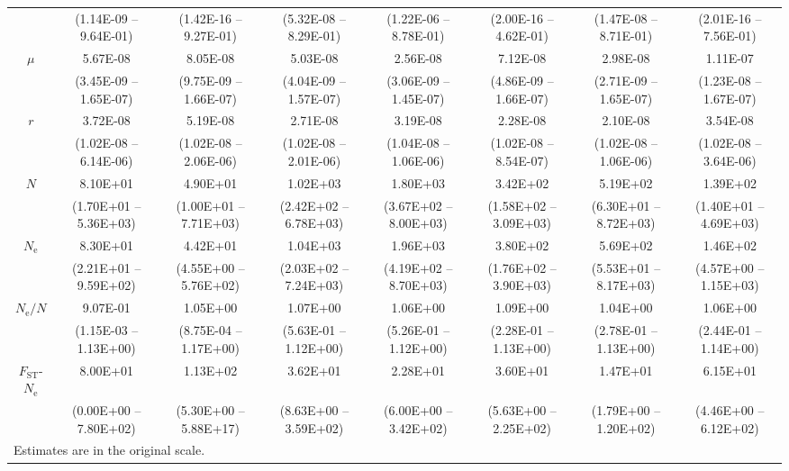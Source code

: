 \documentclass[a4paper, 12pt]{article}
\begin{document}
\begin{table}
\begin{tiny}
\begin{tabular}{cccccccc}
         & (1.14E-09 – 9.64E-01) & (1.42E-16 – 9.27E-01) & (5.32E-08 – 8.29E-01) & (1.22E-06 – 8.78E-01) & (2.00E-16 – 4.62E-01) & (1.47E-08 – 8.71E-01) & (2.01E-16 – 7.56E-01) \\
        $\mu$ & 5.67E-08 & 8.05E-08 & 5.03E-08 & 2.56E-08 & 7.12E-08 & 2.98E-08 & 1.11E-07 \\
         & (3.45E-09 – 1.65E-07) & (9.75E-09 – 1.66E-07) & (4.04E-09 – 1.57E-07) & (3.06E-09 – 1.45E-07) & (4.86E-09 – 1.66E-07) & (2.71E-09 – 1.65E-07) & (1.23E-08 – 1.67E-07) \\
        $r$ & 3.72E-08 & 5.19E-08 & 2.71E-08 & 3.19E-08 & 2.28E-08 & 2.10E-08 & 3.54E-08 \\
         & (1.02E-08 – 6.14E-06) & (1.02E-08 – 2.06E-06) & (1.02E-08 – 2.01E-06) & (1.04E-08 – 1.06E-06) & (1.02E-08 – 8.54E-07) & (1.02E-08 – 1.06E-06) & (1.02E-08 – 3.64E-06) \\
        $N$ & 8.10E+01 & 4.90E+01 & 1.02E+03 & 1.80E+03 & 3.42E+02 & 5.19E+02 & 1.39E+02 \\
         & (1.70E+01 – 5.36E+03) & (1.00E+01 – 7.71E+03) & (2.42E+02 – 6.78E+03) & (3.67E+02 – 8.00E+03) & (1.58E+02 – 3.09E+03) & (6.30E+01 – 8.72E+03) & (1.40E+01 – 4.69E+03) \\
        $N_{\mathrm{e}}$ & 8.30E+01 & 4.42E+01 & 1.04E+03 & 1.96E+03 & 3.80E+02 & 5.69E+02 & 1.46E+02 \\
         & (2.21E+01 – 9.59E+02) & (4.55E+00 – 5.76E+02) & (2.03E+02 – 7.24E+03) & (4.19E+02 – 8.70E+03) & (1.76E+02 – 3.90E+03) & (5.53E+01 – 8.17E+03) & (4.57E+00 – 1.15E+03) \\
        $N_{\mathrm{e}}/N$ & 9.07E-01 & 1.05E+00 & 1.07E+00 & 1.06E+00 & 1.09E+00 & 1.04E+00 & 1.06E+00 \\
         & (1.15E-03 – 1.13E+00) & (8.75E-04 – 1.17E+00) & (5.63E-01 – 1.12E+00) & (5.26E-01 – 1.12E+00) & (2.28E-01 – 1.13E+00) & (2.78E-01 – 1.13E+00) & (2.44E-01 – 1.14E+00) \\
         \midrule
        $F_{\mathrm{ST}}$-$N_{\mathrm{e}}$ & 8.00E+01 & 1.13E+02 & 3.62E+01 & 2.28E+01 & 3.60E+01 & 1.47E+01 & 6.15E+01 \\
         & (0.00E+00 – 7.80E+02) & (5.30E+00 – 5.88E+17) & (8.63E+00 – 3.59E+02) & (6.00E+00 – 3.42E+02) & (5.63E+00 – 2.25E+02) & (1.79E+00 – 1.20E+02) & (4.46E+00 – 6.12E+02) \\
          \bottomrule
    \multicolumn{8}{l}{\tiny  Estimates are in the original scale.} \\
    \end{tabular}
\label{tab:supple_bees_posteriors}
\end{tiny}
\end{table}
\end{document}
